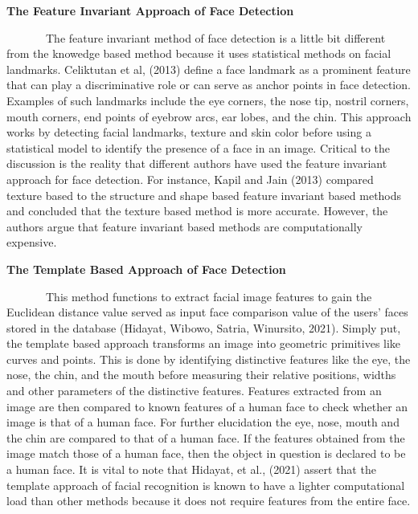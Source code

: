 \documentclass[
  12pt,
]{article}
\begin{document}
\textbf{The Feature Invariant Approach of Face Detection}\\
\vspace{-1.2em}

~~~~~~~The feature invariant method of face detection is a little bit
different from the knowedge based method because it uses statistical
methods on facial landmarks. Celiktutan et al, (2013) define a face
landmark as a prominent feature that can play a discriminative role or
can serve as anchor points in face detection. Examples of such landmarks
include the eye corners, the nose tip, nostril corners, mouth corners,
end points of eyebrow arcs, ear lobes, and the chin. This approach works
by detecting facial landmarks, texture and skin color before using a
statistical model to identify the presence of a face in an image.
Critical to the discussion is the reality that different authors have
used the feature invariant approach for face detection. For instance,
Kapil and Jain (2013) compared texture based to the structure and shape
based feature invariant based methods and concluded that the texture
based method is more accurate. However, the authors argue that feature
invariant based methods are computationally expensive.

\textbf{The Template Based Approach of Face Detection}\\
\vspace{-1.2em}

~~~~~~~This method functions to extract facial image features to gain
the Euclidean distance value served as input face comparison value of
the users' faces stored in the database (Hidayat, Wibowo, Satria,
Winursito, 2021). Simply put, the template based approach transforms an
image into geometric primitives like curves and points. This is done by
identifying distinctive features like the eye, the nose, the chin, and
the mouth before measuring their relative positions, widths and other
parameters of the distinctive features. Features extracted from an image
are then compared to known features of a human face to check whether an
image is that of a human face. For further elucidation the eye, nose,
mouth and the chin are compared to that of a human face. If the features
obtained from the image match those of a human face, then the object in
question is declared to be a human face. It is vital to note that
Hidayat, et al., (2021) assert that the template approach of facial
recognition is known to have a lighter computational load than other
methods because it does not require features from the entire face.
\end{document}
